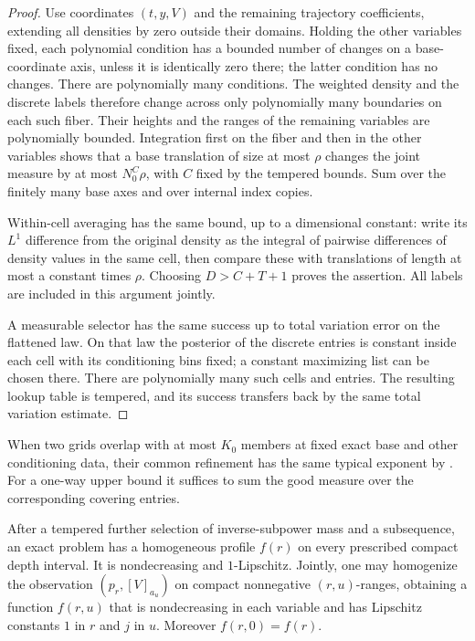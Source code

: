 \begin{proof}
Use coordinates \((t,y,V)\) and the remaining trajectory
coefficients, extending all densities by zero outside their
domains.  Holding the other variables fixed, each polynomial
condition has a bounded number of changes on a base-coordinate
axis, unless it is identically zero there; the latter condition
has no changes.  There are polynomially many conditions.
The weighted density and the discrete labels therefore change
across only polynomially many boundaries on each such fiber.
Their heights and the ranges of the remaining variables are
polynomially bounded.  Integration first on the fiber and then in
the other variables shows that a base translation of size at most
\(\rho\) changes the joint measure by at most
\(N_0^C\rho\), with \(C\) fixed by the tempered bounds.
Sum over the finitely many base axes and over internal index copies.

Within-cell averaging has the same bound, up to a dimensional
constant: write its \(L^1\) difference from the original density
as the integral of pairwise differences of density values in the
same cell, then compare these with translations of length at most
a constant times \(\rho\).  Choosing \(D>C+T+1\) proves the assertion.
All labels are included in this argument jointly.

A measurable selector has the same success up to total variation
error on the flattened law.  On that law the posterior of the
discrete entries is constant inside each cell with its conditioning
bins fixed; a constant maximizing list can be chosen there.
There are polynomially many such cells and entries.  The resulting
lookup table is tempered, and its success transfers back by the
same total variation estimate.
\end{proof}

When two grids overlap with at most \(K_0\) members at fixed exact
base and other conditioning data, their common refinement has the
same typical exponent by .
For a one-way upper bound it suffices to sum the good measure over
the corresponding covering entries.

\begin{lemma}[Homogenization]\label{a01:homogenization}
After a tempered further selection of inverse-subpower mass and a
subsequence, an exact problem has a homogeneous profile \(f(r)\)
on every prescribed compact depth interval.  It is nondecreasing
and \(1\)-Lipschitz.  Jointly, one may homogenize the observation
\((p_r,[V]_{a_u})\) on compact nonnegative \((r,u)\)-ranges, obtaining
a function \(f(r,u)\) that is nondecreasing in each variable and
has Lipschitz constants \(1\) in \(r\) and \(j\) in \(u\).
Moreover \(f(r,0)=f(r)\).
\end{lemma}

